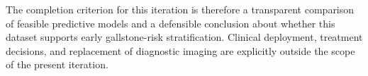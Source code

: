 The completion criterion for this iteration is therefore a transparent comparison of feasible predictive models and a defensible conclusion about whether this dataset supports early gallstone-risk stratification. Clinical deployment, treatment decisions, and replacement of diagnostic imaging are explicitly outside the scope of the present iteration.
